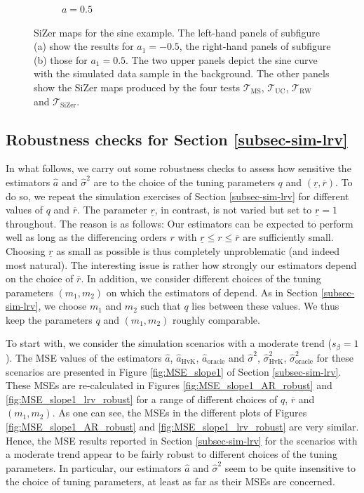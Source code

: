 \begin{figure}[p]
\begin{subfigure}[b]{0.475\textwidth}
\caption{$a=0.5$}
\end{subfigure}
\caption{SiZer maps for the sine example. The left-hand panels of subfigure (a) show the results for $a_1=-0.5$, the right-hand panels of subfigure (b) those for $a_1=0.5$. The two upper panels depict the sine curve with the simulated data sample in the background. The other panels show the SiZer maps produced by the four tests $\mathcal{T}_{\text{MS}}$, $\mathcal{T}_{\text{UC}}$, $\mathcal{T}_{\text{RW}}$ and $\mathcal{T}_{\text{SiZer}}$.}\label{fig:sizer:sine}
\end{figure}  


\newpage
\subsection*{Robustness checks for Section \ref{subsec-sim-lrv}}


In what follows, we carry out some robustness checks to assess how sensitive the estimators $\widehat{a}$ and $\widehat{\sigma}^2$ are to the choice of the tuning parameters $q$ and $(\underline{r},\overline{r})$. To do so, we repeat the simulation exercises of Section \ref{subsec-sim-lrv} for different values of $q$ and $\overline{r}$. The parameter $\underline{r}$, in contrast, is not varied but set to $\underline{r}=1$ throughout. The reason is as follows: Our estimators can be expected to perform well as long as the differencing orders $r$ with $\underline{r} \le r \le \overline{r}$ are sufficiently small. Choosing $\underline{r}$ as small as possible is thus completely unproblematic (and indeed most natural). The interesting issue is rather how strongly our estimators depend on the choice of $\overline{r}$. %
In addition, we consider different choices of the tuning parameters $(m_1,m_2)$ on which the estimators of \cite{Hall2003} depend. As in Section \ref{subsec-sim-lrv}, we choose $m_1$ and $m_2$ such that $q$ lies between these values. We thus keep the parameters $q$ and $(m_1,m_2)$ roughly comparable. 


To start with, we consider the simulation scenarios with a moderate trend ($s_\beta = 1$). The MSE values of the estimators $\widehat{a}$, $\widehat{a}_{\text{HvK}}$, $\widehat{a}_{\text{oracle}}$ and $\widehat{\sigma}^2$, $\widehat{\sigma}^2_{\text{HvK}}$, $\widehat{\sigma}^2_{\text{oracle}}$ for these scenarios are presented in Figure \ref{fig:MSE_slope1} of Section \ref{subsec-sim-lrv}. These MSEs are re-calculated in Figures \ref{fig:MSE_slope1_AR_robust} and \ref{fig:MSE_slope1_lrv_robust} for a range of different choices of $q$, $\overline{r}$ and $(m_1,m_2)$. As one can see, the MSEs in the different plots of Figures \ref{fig:MSE_slope1_AR_robust} and \ref{fig:MSE_slope1_lrv_robust} are very similar. Hence, the MSE results reported in Section \ref{subsec-sim-lrv} for the scenarios with a moderate trend appear to be fairly robust to different choices of the tuning parameters. In particular, our estimators $\widehat{a}$ and $\widehat{\sigma}^2$ seem to be quite insensitive to the choice of tuning parameters, at least as far as their MSEs are concerned.


